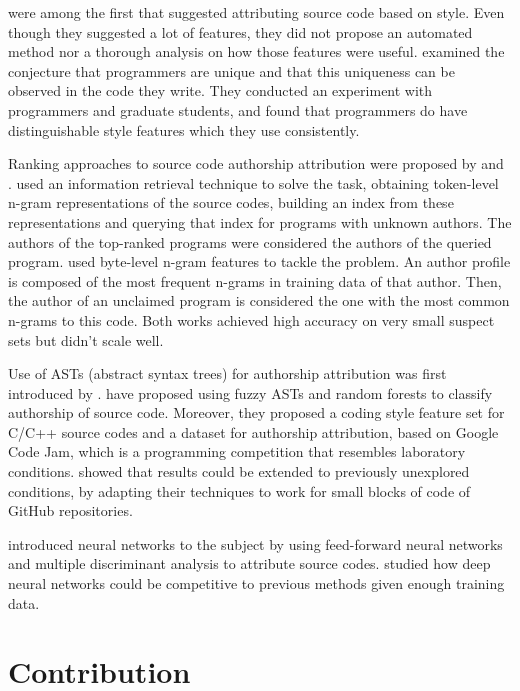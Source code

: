  were among the first that suggested attributing source code based on style. Even though they suggested a lot of features, they did not propose an automated method nor a thorough analysis on how those features were useful.  examined the conjecture that programmers are unique and that this uniqueness can be observed in the code they write. They conducted an experiment with programmers and graduate students, and found that programmers do have distinguishable style features which they use consistently.

Ranking approaches to source code authorship attribution were proposed by  and .  used an information retrieval technique to solve the task, obtaining token-level n-gram representations of the source codes, building an index from these representations and querying that index for programs with unknown authors. The authors of the top-ranked programs were considered the authors of the queried program.  used byte-level n-gram features to tackle the problem. An author profile is composed of the most frequent n-grams in training data of that author. Then, the author of an unclaimed program is considered the one with the most common n-grams to this code. Both works achieved high accuracy on very small suspect sets but didn't scale well.

Use of ASTs (abstract syntax trees) for authorship attribution was first introduced by .  have proposed using fuzzy ASTs and random forests to classify authorship of source code. Moreover, they proposed a coding style feature set for C/C++ source codes and a dataset for authorship attribution, based on Google Code Jam, which is a programming competition that resembles laboratory conditions.  showed that  results could be extended to previously unexplored conditions, by adapting their techniques to work for small blocks of code of GitHub repositories.

 introduced neural networks to the subject by using feed-forward neural networks and multiple discriminant analysis to attribute source codes.  studied how deep neural networks could be competitive to previous methods given enough training data.

\section{Contribution}

